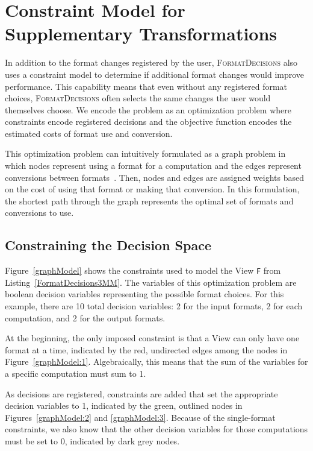 \documentclass[sigconf,review=true]{acmart}
\newcommand{\FormatDecisions}[0]{{\textsc{FormatDecisions}}}
\begin{document}
\section{Constraint Model for Supplementary Transformations}

In addition to the format changes registered by the user, \FormatDecisions{} also uses a constraint model to determine if additional format changes would improve performance. 
This capability means that even without any registered format choices, \FormatDecisions{} often selects the same changes the user would themselves choose.
We encode the problem as an optimization problem where constraints encode registered decisions and the objective function encodes the estimated costs of format use and conversion.

This optimization problem can intuitively formulated as a graph problem in which nodes represent using a format for a computation and the edges represent conversions between formats~\cite{kennedy1998automatic}.
Then, nodes and edges are assigned weights based on the cost of using that format or making that conversion. 
In this formulation, the shortest path through the graph represents the optimal set of formats and conversions to use.

\subsection{Constraining the Decision Space}
Figure~\ref{graphModel} shows the constraints used to model the View \verb.F. from Listing~\ref{FormatDecisions3MM}.
The variables of this optimization problem are boolean decision variables representing the possible format choices. 
For this example, there are 10 total decision variables: 2 for the input formats, 2 for each computation, and 2 for the output formats.

At the beginning, the only imposed constraint is that a View can only have one format at a time, indicated by the red, undirected edges among the nodes in Figure~\ref{graphModel:1}.
Algebraically, this means that the sum of the variables for a specific computation must sum to 1. 

As decisions are registered, constraints are added that set the appropriate decision variables to 1, indicated by the green, outlined nodes in Figures~\ref{graphModel:2} and \ref{graphModel:3}. 
Because of the single-format constraints, we also know that the other decision variables for those computations must be set to 0, indicated by dark grey nodes.
\end{document}
